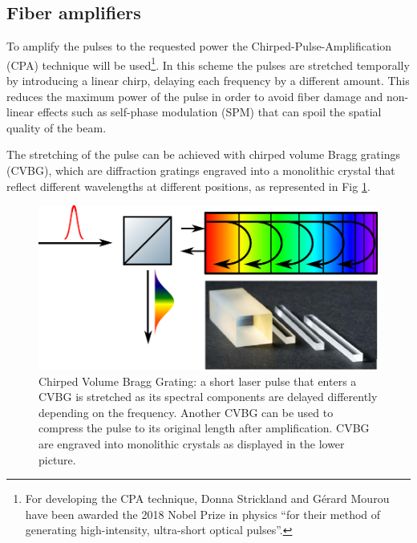 \subsection{Fiber amplifiers}
To amplify the pulses to the requested power the Chirped-Pulse-Amplification (CPA) technique \parencite{Strickland1985} will be used\footnote{For developing the CPA technique, Donna Strickland and Gérard Mourou have been awarded the 2018 Nobel Prize in physics “for their method of generating high-intensity, ultra-short optical pulses”.}.
In this scheme the pulses are stretched temporally by introducing a linear chirp, delaying each frequency by a different amount. This reduces the maximum power of the pulse in order to avoid fiber damage and non-linear effects such as self-phase modulation (SPM) that can spoil the spatial quality of the beam.

The stretching of the pulse can be achieved with chirped volume Bragg gratings (CVBG), which are diffraction gratings engraved into a monolithic crystal that reflect different wavelengths at different positions, as represented in Fig \ref{fig:CVBG}.
\begin{figure}
	\centering
	\includegraphics[width=0.9\linewidth]{images/CVBG.eps}
	\caption{Chirped Volume Bragg Grating: a short laser pulse that enters a CVBG is stretched as its spectral components are delayed differently depending on the frequency. Another CVBG can be used to compress the pulse to its original length after amplification. CVBG are engraved into monolithic crystals as displayed in the lower picture.}
	\label{fig:CVBG}
\end{figure}
